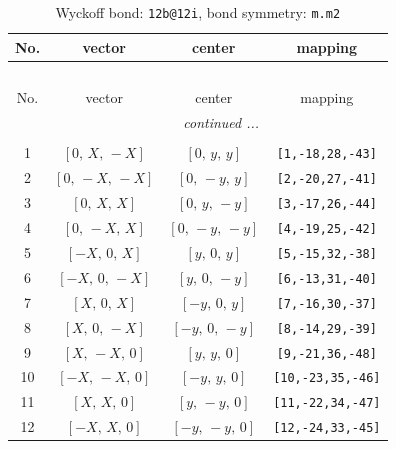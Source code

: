 \documentclass[fleqn,8pt]{jsarticle}
\begin{document}
\begin{longtable}{cccc}
\caption{Wyckoff bond: {\tt 12b@12i}, bond symmetry: {\tt m.m2}}
 \\
 \hline \hline
No. & vector & center & mapping \\ \hline \endfirsthead

\multicolumn{3}{l}{\tablename\ \thetable{}} \\
 \hline \hline
No. & vector & center & mapping \\ \hline \endhead

 \hline \hline
\multicolumn{3}{r}{\footnotesize\it continued ...} \\ \endfoot

 \hline \hline
\multicolumn{3}{r}{} \\ \endlastfoot

1 & $\left[ 0,\, X,\, - X \right]$ & $\left[ 0,\, y,\, y \right]$ & {\tt [1,-18,28,-43]} \\ \hline
2 & $\left[ 0,\, - X,\, - X \right]$ & $\left[ 0,\, - y,\, y \right]$ & {\tt [2,-20,27,-41]} \\ \hline
3 & $\left[ 0,\, X,\, X \right]$ & $\left[ 0,\, y,\, - y \right]$ & {\tt [3,-17,26,-44]} \\ \hline
4 & $\left[ 0,\, - X,\, X \right]$ & $\left[ 0,\, - y,\, - y \right]$ & {\tt [4,-19,25,-42]} \\ \hline
5 & $\left[ - X,\, 0,\, X \right]$ & $\left[ y,\, 0,\, y \right]$ & {\tt [5,-15,32,-38]} \\ \hline
6 & $\left[ - X,\, 0,\, - X \right]$ & $\left[ y,\, 0,\, - y \right]$ & {\tt [6,-13,31,-40]} \\ \hline
7 & $\left[ X,\, 0,\, X \right]$ & $\left[ - y,\, 0,\, y \right]$ & {\tt [7,-16,30,-37]} \\ \hline
8 & $\left[ X,\, 0,\, - X \right]$ & $\left[ - y,\, 0,\, - y \right]$ & {\tt [8,-14,29,-39]} \\ \hline
9 & $\left[ X,\, - X,\, 0 \right]$ & $\left[ y,\, y,\, 0 \right]$ & {\tt [9,-21,36,-48]} \\ \hline
10 & $\left[ - X,\, - X,\, 0 \right]$ & $\left[ - y,\, y,\, 0 \right]$ & {\tt [10,-23,35,-46]} \\ \hline
11 & $\left[ X,\, X,\, 0 \right]$ & $\left[ y,\, - y,\, 0 \right]$ & {\tt [11,-22,34,-47]} \\ \hline
12 & $\left[ - X,\, X,\, 0 \right]$ & $\left[ - y,\, - y,\, 0 \right]$ & {\tt [12,-24,33,-45]} \\
\end{longtable}
\renewcommand{\arraystretch}{1.2}
\end{document}
